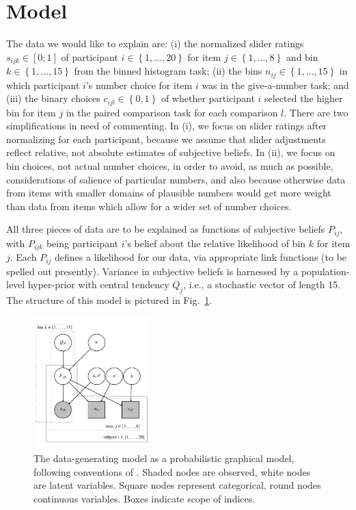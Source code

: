 \documentclass[10pt,letterpaper]{article}
\newcommand{\set}[1]{\left\{#1\right\}}
\newcommand{\citet}[1]{\citeA{#1}}
\newcommand{\figref}[1]{Fig.~\ref{#1}}
\begin{document}
\section{Model}

The data we would like to explain are: (i) the normalized slider ratings $s_{ijk} \in [0;1]$ of
participant $i \in \set{1, \dots, 20}$ for item $j \in \set{1, \dots, 8}$ and bin
$k \in \set{1, \dots, 15}$ from the binned histogram task; (ii) the bins $n_{ij} \in \set{1, \dots, 15}$ in which participant
$i$'s number choice for item $i$ was in the give-a-number task; and (iii) the binary choices $c_{ijl} \in \set{0,1}$ of
whether participant $i$ selected the higher bin for item $j$ in the paired comparison task for each comparison
$l$. There are two simplifications in need of commenting. In (i), we focus on slider ratings after
normalizing for each participant, because we assume that slider adjustments reflect relative, not
absolute estimates of subjective beliefs. In (ii), we focus on bin choices, not actual number
choices, in order to avoid, as much as possible, considerations of salience of particular
numbers, and also because otherwise data from items with smaller domains of plausible numbers
would get more weight than data from items which allow for a wider set of number choices.

All three pieces of data are to be explained as functions of subjective beliefs $P_{ij}$, with
$P_{ijk}$ being participant $i$'s belief about the relative likelihood of bin $k$ for item
$j$. Each $P_{ij}$ defines a likelihood for our data, via appropriate link functions (to be
spelled out presently). Variance in subjective beliefs is harnessed by a population-level
hyper-prior with central tendency $Q_{j}$, i.e., a stochastic vector of length 15. The
structure of this model is pictured in \figref{fig:ModelGraph}.

\begin{figure}[]
  \centering
  \includegraphics[width = 0.4\textwidth]{modelGraph/modelGraphNoMath.pdf}
  \caption{The data-generating model as a probabilistic graphical model, following conventions
    of \citet{LeeWagenmakers2013:Bayesian-Cognit}. Shaded nodes are observed, white nodes are
    latent variables. Square nodes represent categorical, round nodes continuous
    variables. Boxes indicate scope of indices.}
  \label{fig:ModelGraph}
\end{figure}
\end{document}
